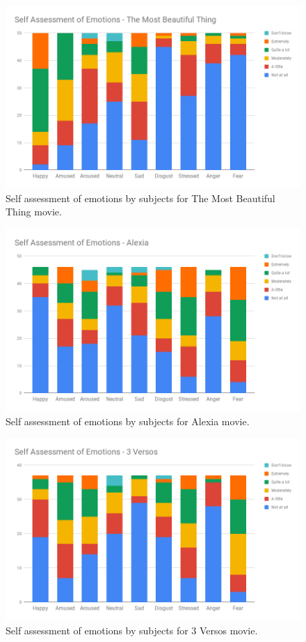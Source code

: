 \begin{figure}
\centering
\includegraphics[width=140mm]{Figures/the_most_beautiful_thing.png}
\caption{Self assessment of emotions by subjects for The Most Beautiful Thing movie.}
\label{fig:the_most_beautiful_thing}
\end{figure}

\begin{figure}
\centering
\includegraphics[width=140mm]{Figures/alexia.png}
\caption{Self assessment of emotions by subjects for Alexia movie.}
\label{fig:alexia}
\end{figure}

\begin{figure}
\centering
\includegraphics[width=140mm]{Figures/3_versos.png}
\caption{Self assessment of emotions by subjects for 3 Versos movie.}
\label{fig:3_versos}
\end{figure}

